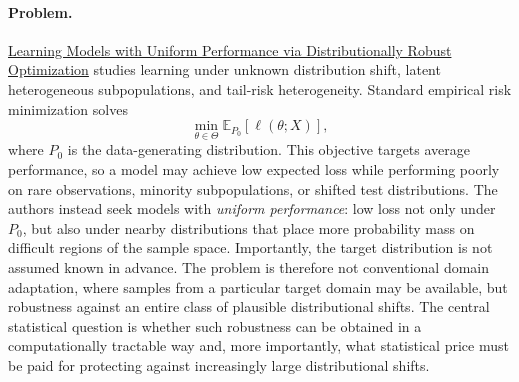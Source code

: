 \documentclass[11pt]{article}
\begin{document}
\paragraph{Problem.}
\href{https://arxiv.org/pdf/1810.08750}{Learning Models with Uniform Performance via Distributionally Robust Optimization}
 studies learning under unknown distribution shift, latent heterogeneous subpopulations, and tail-risk heterogeneity. Standard empirical risk minimization solves
\[
\min_{\theta \in \Theta}
\mathbb{E}_{P_0}
\left[
\ell(\theta;X)
\right],
\]
where \(P_0\) is the data-generating distribution. This objective targets average performance, so a model may achieve low expected loss while performing poorly on rare observations, minority subpopulations, or shifted test distributions.
The authors instead seek models with \emph{uniform performance}: low loss not only under \(P_0\), but also under nearby distributions that place more probability mass on difficult regions of the sample space. Importantly, the target distribution is not assumed known in advance. The problem is therefore not conventional domain adaptation, where samples from a particular target domain may be available, but robustness against an entire class of plausible distributional shifts.
The central statistical question is whether such robustness can be obtained in a computationally tractable way and, more importantly, what statistical price must be paid for protecting against increasingly large distributional shifts.
\end{document}

